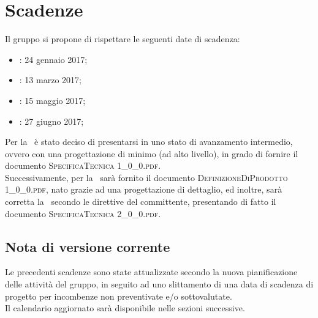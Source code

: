\newpage
\section{Scadenze}
Il gruppo \textit{\gruppo} si propone di rispettare le seguenti date di scadenza:
\begin{itemize}
	\item \textbf{\RR}: 24 gennaio 2017;
	\item \textbf{\RP}: 13 marzo 2017;
	\item \textbf{\RQ}: 15 maggio 2017;
	\item \textbf{\RA}: 27 giugno 2017;
\end{itemize}
Per la \RP\ è stato deciso di presentarsi in uno stato di avanzamento intermedio, ovvero con una progettazione di minimo (ad alto livello), in grado di fornire il documento \textsc{SpecificaTecnica 1\_0\_0.pdf}.\\
Successivamente, per la \RQ\ sarà fornito il documento \textsc{DefinizioneDiProdotto 1\_0\_0.pdf}, nato grazie ad una progettazione di dettaglio, ed inoltre, sarà corretta la \ST\ secondo le direttive del committente, presentando di fatto il documento \textsc{SpecificaTecnica 2\_0\_0.pdf}.

\subsection{Nota di versione corrente}
Le precedenti scadenze sono state attualizzate secondo la nuova pianificazione delle attività del gruppo, in seguito ad uno slittamento di una data di scadenza di progetto per incombenze non preventivate e/o sottovalutate.\\
Il calendario aggiornato sarà disponibile nelle sezioni successive.